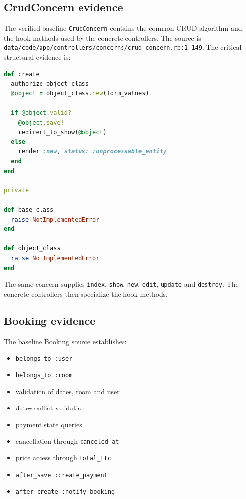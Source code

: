 \documentclass[10pt,a4paper]{article}
\newcommand{\code}[1]{\texttt{\small #1}}
\begin{document}
\subsection{CrudConcern evidence}

The verified baseline \code{CrudConcern} contains the common CRUD algorithm and the hook methods used by the concrete controllers. The source is \code{data/code/app/controllers/concerns/crud\_concern.rb:1--149}. The critical structural evidence is:

\begin{lstlisting}[language=Ruby,caption={Core Template Method structure in CrudConcern}]
def create
  authorize object_class
  @object = object_class.new(form_values)

  if @object.valid?
    @object.save!
    redirect_to_show(@object)
  else
    render :new, status: :unprocessable_entity
  end
end

private

def base_class
  raise NotImplementedError
end

def object_class
  raise NotImplementedError
end
\end{lstlisting}

The same concern supplies \code{index}, \code{show}, \code{new}, \code{edit}, \code{update} and \code{destroy}. The concrete controllers then specialize the hook methods.

\subsection{Booking evidence}

The baseline Booking source establishes:

\begin{itemize}[leftmargin=*]
\item \code{belongs\_to :user}
\item \code{belongs\_to :room}
\item validation of dates, room and user
\item date-conflict validation
\item payment state queries
\item cancellation through \code{canceled\_at}
\item price access through \code{total\_ttc}
\item \code{after\_save :create\_payment}
\item \code{after\_create :notify\_booking}
\end{itemize}
\end{document}
